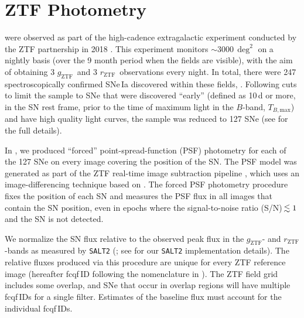 \documentclass[twocolumn]{./aastex63}
\newcommand{\rztf}{$r_\mathrm{ZTF}$}
\newcommand{\gztf}{$g_\mathrm{ZTF}$}
\newcommand{\tbmax}{$T_{B,\mathrm{max}}$}
\begin{document}

\section{ZTF Photometry}\label{sec:ztf}

 were observed as part of the high-cadence
extragalactic experiment conducted by the ZTF partnership in 2018
\citep{Bellm19a}. This experiment monitors $\sim$3000\,$\deg^2$ on a nightly
basis (over the 9 month period when the fields are visible), with the aim of
obtaining 3 \gztf\ and 3 \rztf\ observations every night. In total, there were
247 spectroscopically confirmed SNe\,Ia discovered within these fields,
. Following cuts
to limit the sample to SNe that were discovered ``early'' (defined as 10\,d or
more, in the SN rest frame, prior to the time of maximum light in the
$B$-band, \tbmax) and have high quality light curves, the sample was reduced
to 127 SNe (see \citealt{Yao19} for the full details).

In \citet{Yao19}, we produced ``forced'' point-spread-function (PSF)
photometry for each of the 127 SNe on every image covering the position of the
SN. The PSF model was generated as part of the ZTF real-time image subtraction
pipeline \citep{Masci19}, which uses an image-differencing technique based on
\citet{Zackay16}. The forced PSF photometry procedure fixes the position of
each SN and measures the PSF flux in all images that contain the SN position,
even in epochs where the signal-to-noise ratio (S/N)\,$\lesssim 1$ and the SN is
not detected.

We normalize the SN flux relative to the observed peak flux in the \gztf- and
\rztf-bands as measured by \texttt{SALT2} (\citealt{Guy07}; see
\citealt{Yao19} for our \texttt{SALT2} implementation details). The relative
fluxes produced via this procedure are unique for every ZTF reference image
(hereafter fcqf\,ID following the nomenclature in \citealt{Yao19}). The ZTF
field grid includes some overlap, and SNe that occur in overlap regions will
have multiple fcqf\,IDs for a single filter. Estimates of the baseline flux
 must account for the individual
fcqf\,IDs. 
\end{document}
